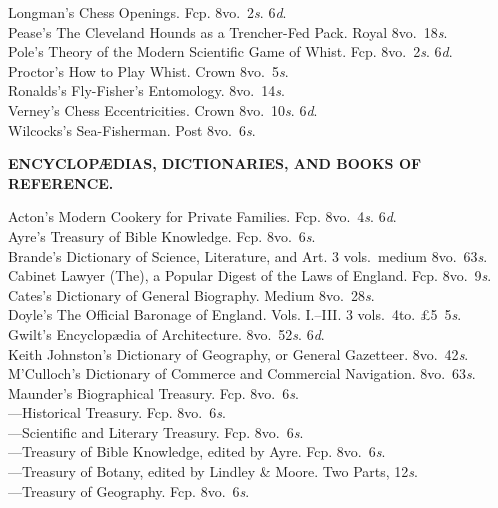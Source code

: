 \documentclass[letterpaper,12pt,oneside,openany]{memoir}
\newcommand{\E}{\hspace*{2mm}---\hspace*{2mm}}
\begin{document}
\begin{footnotesize}
Longman's Chess Openings. Fcp. 8vo.\ 2\textit{s}. 6\textit{d}.\\
Pease's The Cleveland Hounds as a Trencher-Fed Pack. Royal 8vo.\ 18\textit{s}.\\
Pole's Theory of the Modern Scientific Game of Whist. Fcp. 8vo.\ 2\textit{s}. 6\textit{d}.\\
Proctor's How to Play Whist. Crown 8vo.\ 5\textit{s}.\\
Ronalds's Fly-Fisher's Entomology. 8vo.\ 14\textit{s}.\\
Verney's Chess Eccentricities. Crown 8vo.\ 10\textit{s}. 6\textit{d}.\\
Wilcocks's Sea-Fisherman. Post 8vo.\ 6\textit{s}.
\begin{center}
\textbf{ENCYCLOP{\AE}DIAS, DICTIONARIES, AND BOOKS OF REFERENCE.}
\end{center}
\raggedbottom
Acton's Modern Cookery for Private Families. Fcp. 8vo.\ 4\textit{s}. 6\textit{d}.\\
Ayre's Treasury of Bible Knowledge. Fcp. 8vo.\ 6\textit{s}.\\
Brande's Dictionary of Science, Literature, and Art. 3 vols.\ medium 8vo.\ 63\textit{s}.\\
Cabinet Lawyer (The), a Popular Digest of the Laws of England. Fcp. 8vo.\ 9\textit{s}.\\
Cates's Dictionary of General Biography. Medium 8vo.\ 28\textit{s}.\\
Doyle's The Official Baronage of England. Vols. I.--III. 3 vols.\ 4to. \pounds5\ 5\textit{s}.\\
Gwilt's Encyclop{\ae}dia of Architecture. 8vo.\ 52\textit{s}. 6\textit{d}.\\
Keith Johnston's Dictionary of Geography, or General Gazetteer. 8vo.\ 42\textit{s}.\\
M'Culloch's Dictionary of Commerce and Commercial Navigation. 8vo.\ 63\textit{s}.\\
Maunder's Biographical Treasury. Fcp. 8vo.\ 6\textit{s}.\\
\E Historical Treasury. Fcp. 8vo.\ 6\textit{s}.\\
\E Scientific and Literary Treasury. Fcp. 8vo.\ 6\textit{s}.\\
\E Treasury of Bible Knowledge, edited by Ayre. Fcp. 8vo.\ 6\textit{s}.\\
\E Treasury of Botany, edited by Lindley \& Moore. Two Parts, 12\textit{s}.\\
\E Treasury of Geography. Fcp. 8vo.\ 6\textit{s}.\\

\end{footnotesize}
\end{document}
